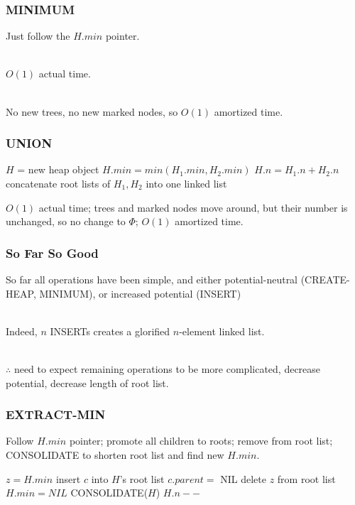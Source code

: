 \documentclass{beamer}
\newcommand{\stanza}{ \\~\ }
\begin{document}
\begin{frame} \frametitle{MINIMUM}
Just follow the $H.min$ pointer. \stanza

$O(1)$ actual time. \stanza

No new trees, no new marked nodes, so $O(1)$ amortized time.
\end{frame}

\begin{frame} \frametitle{UNION}
  {\small
  \begin{algorithmic}[1]
      \State {}
      \State {}
    \Else
      \State $H$ = new heap object
      \State $H.min = min(H_1.min, H_2.min)$
      \State $H.n = H_1.n + H_2.n$
      \State concatenate root lists of $H_1, H_2$ into one linked list
      \State {}
    \EndIf
    \EndFunction
  \end{algorithmic}
  }
  \vspace{.5cm}
  $O(1)$ actual time; trees and marked nodes move around, but their number
  is unchanged, so no change to $\Phi$; $O(1)$ amortized time.
\end{frame}

\begin{frame} \frametitle{So Far So Good}
So far all operations have been simple, and either potential-neutral
(CREATE-HEAP, MINIMUM), or increased potential (INSERT) \stanza

Indeed, $n$ INSERTs creates a glorified $n$-element linked list. \stanza

$\therefore$ need to expect remaining operations to be more complicated,
decrease potential, decrease length of root list.
\end{frame}

\begin{frame} \frametitle{EXTRACT-MIN}
Follow $H.min$ pointer; promote all children to roots; remove from root list;
CONSOLIDATE to shorten root list and find new $H.min.$

{\small
\begin{algorithmic}[1]
  \State $z = H.min$
    \State insert $c$ into $H$'s root list
    \State $c.parent = $ NIL
  \EndFor
  \State delete $z$ from root list
    \State $H.min = NIL$ 
  \Else
    \State CONSOLIDATE($H$) 
  \EndIf
  \State $H.n--$
  \State {}
  \EndFunction
\end{algorithmic}
}
\end{frame}
\end{document}
